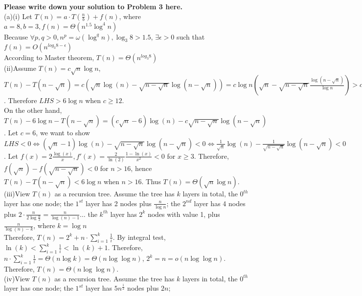 \documentclass[11pt,twoside]{article}
\newenvironment{solution}{{\par\noindent\it Solution.}}{}
\begin{document}
\begin{solution}
\textbf{Please write down your solution to Problem 3 here.}
\vspace{0.45cm}\\
(a)(i) Let $T(n)=a\cdot T(\frac{n}{b})+f(n)$, where $a=8, b=3, f(n)=\Theta(n^{1.5}\log^4n)$\\
Because $\forall p,q>0, n^p=\omega(\log^qn), \log_3{8}>1.5$, $\exists \epsilon>0$ such that $f(n)=O(n^{log_3{8}-\epsilon})$\\
According to Master theorem, $T(n)=\Theta(n^{log_3{8}})$
\vspace{0.25cm}\\
(ii)Assume $T(n)=c\sqrt{n}\log{n}$, $T(n)-T(n-\sqrt{n})=c\left(\sqrt{n}\log(n)-\sqrt{n-\sqrt{n}}\log(n-\sqrt{n})\right)
=c\log{n}(\sqrt{n}-\sqrt{n-\sqrt{n}}\frac{\log(n-\sqrt{n})}{\log{n}})>c\log{n}(\sqrt{n}-\sqrt{n-\sqrt{n}})>c\log{n}\cdot\frac{1}{2}
(\text{because} (\sqrt{n}-\frac{1}{2})^2>n-\sqrt{n})$. Therefore $LHS>6\log{n}$ when $c\geq 12$.\\
On the other hand, $T(n)-6\log{n}-T(n-\sqrt{n})=(c\sqrt{n}-6)\log(n)-c\sqrt{n-\sqrt{n}}\log(n-\sqrt{n})$. Let $c=6$, we want to show $LHS<0
\iff(\sqrt{n}-1)\log(n)-\sqrt{n-\sqrt{n}}\log(n-\sqrt{n})<0
\iff \frac{1}{\sqrt{n}}\log(n)-\frac{1}{\sqrt{n-\sqrt{n}}}\log(n-\sqrt{n})<0$. Let $f(x)=2\frac{\log(x)}{x}, f'(x)=\frac{2}{\ln(2)}\frac{1-\ln(x)}{x^2}<0$
for $x \geq 3$. Therefore, $f(\sqrt{n})-f(\sqrt{n-\sqrt{n}})<0$ for $n>16$, hence $T(n)-T(n-\sqrt{n})<6\log{n}$ when $n>16$. Thus $T(n)=\Theta(\sqrt{n}\log{n})$.
\vspace{0.25cm}\\
(iii)View $T(n)$ as a recursion tree. Assume the tree has $k$ layers in total,
the $0^{th}$ layer has one node; the $1^{st}$ layer has 2 nodes plus $\frac{n}{\log{n}}$; 
the $2^{nd}$ layer has 4 nodes plus $2\cdot\frac{n}{2\log{\frac{n}{2}}}=\frac{n}{\log(n)-1}\dots$
the $k^{th}$ layer has $2^k$ nodes with value 1, plus $\frac{n}{\log(n)-k}$, where $k=\log{n}$\\
Therefore, $T(n)=2^k+n\cdot\sum_{i=1}^k\frac{1}{i}$. By integral test, $\ln(k) < \sum_{i=1}^k \frac{1}{i} < \ln(k) + 1$.
Therefore, $n\cdot\sum_{i=1}^k\frac{1}{i}=\Theta(n\log{k})=\Theta(n\log\log{n})$, $2^k=n=o(n\log\log{n})$.
Therefore, $T(n)=\Theta(n\log\log{n})$.
\vspace{0.25cm}\\
(iv)View $T(n)$ as a recursion tree. Assume the tree has $k$ layers in total,
the $0^{th}$ layer has one node; the $1^{st}$ layer has $5n^{\frac{1}{2}}$ nodes plus $2n$; 

\end{solution}
\end{document}
